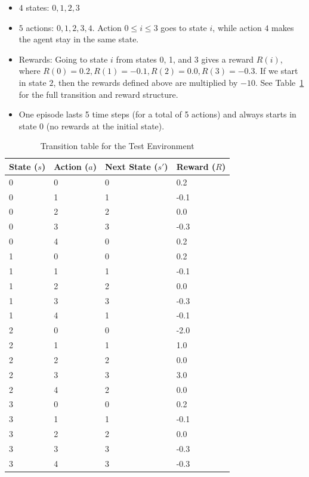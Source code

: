 \documentclass[11pt]{article}
\theoremstyle{case}
\begin{document}
\begin{itemize}
	\item $ 4 $ states: $ 0, 1, 2, 3 $
	\item $ 5 $ actions: $ 0, 1, 2, 3, 4 $. Action $ 0 \leq i \leq 3 $ goes to state $ i $, while action $ 4 $ makes the agent stay in the same state.
	\item Rewards: Going to state $ i $ from states 0, 1, and 3 gives a reward $R(i) $, where $R(0) = 0.2, R(1) = -0.1, R(2) = 0.0, R(3) = -0.3 $. If we start in state $ 2 $, then the rewards defined above are multiplied by $ - 10 $.  See Table~\ref{tab:TestEnv} for the full transition and reward structure. 
	\item One episode lasts 5 time steps (for a total of 5 actions) and always starts in state $ 0 $ (no rewards at the initial state).        
\end{itemize}

\begin{table}[h]
    \centering
    \begin{tabular}{ | l | l | l | l |}  
		\hline
		State ($s$) & Action ($a$) & Next State ($s'$) & Reward ($R$) \\ \hline
		0 & 0 & 0 & 0.2    \\ \hline
		0 & 1 & 1 & -0.1   \\ \hline
		0 & 2 & 2 & 0.0 \\ \hline
		0 & 3 & 3 & -0.3 \\ \hline
		0 & 4 & 0 & 0.2 \\ \hline
		1 & 0 & 0 & 0.2    \\ \hline
		1 & 1 & 1 & -0.1   \\ \hline
		1 & 2 & 2 & 0.0 \\ \hline
		1 & 3 & 3 & -0.3 \\ \hline
		1 & 4 & 1 & -0.1 \\ \hline
		2 & 0 & 0 & -2.0    \\ \hline
		2 & 1 & 1 & 1.0   \\ \hline
		2 & 2 & 2 & 0.0 \\ \hline
		2 & 3 & 3 & 3.0 \\ \hline
		2 & 4 & 2 & 0.0 \\ \hline
		3 & 0 & 0 & 0.2    \\ \hline
		3 & 1 & 1 & -0.1   \\ \hline
		3 & 2 & 2 & 0.0 \\ \hline
		3 & 3 & 3 & -0.3 \\ \hline
		3 & 4 & 3 & -0.3 \\ \hline    
	\end{tabular}
    \caption{Transition table for the Test Environment}
    \label{tab:TestEnv} 
\end{table}
\end{document}
